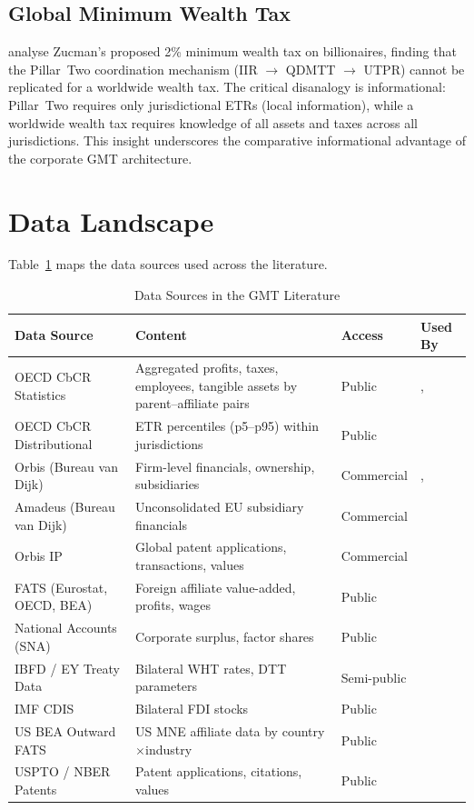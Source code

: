 \documentclass[11pt,a4paper]{article}
\begin{document}
\subsection{Global Minimum Wealth Tax}
\label{subsec:boadway}

\citet{boadway2026} analyse Zucman's proposed 2\% minimum wealth tax on billionaires, finding that the Pillar~Two coordination mechanism (IIR $\to$ QDMTT $\to$ UTPR) cannot be replicated for a worldwide wealth tax. The critical disanalogy is informational: Pillar~Two requires only jurisdictional ETRs (local information), while a worldwide wealth tax requires knowledge of all assets and taxes across all jurisdictions. This insight underscores the comparative informational advantage of the corporate GMT architecture.


\section{Data Landscape}
\label{sec:data}


Table~\ref{tab:data} maps the data sources used across the literature.

\begin{table}[htbp]
\centering
\small
\caption{Data Sources in the GMT Literature}
\label{tab:data}
\begin{tabular}{@{}p{3.5cm}p{4cm}p{2.5cm}p{3.5cm}@{}}
\toprule
\textbf{Data Source} & \textbf{Content} & \textbf{Access} & \textbf{Used By} \\
\midrule
OECD CbCR Statistics & Aggregated profits, taxes, employees, tangible assets by parent--affiliate pairs & Public & \citet{barake2022}, \citet{hugger2025} \\[4pt]
OECD CbCR Distributional & ETR percentiles (p5--p95) within jurisdictions & Public & \citet{hugger2025} \\[4pt]
Orbis (Bureau van Dijk) & Firm-level financials, ownership, subsidiaries & Commercial & \citet{devereux2023}, \citet{bilicka2023} \\[4pt]
Amadeus (Bureau van Dijk) & Unconsolidated EU subsidiary financials & Commercial & \citet{devereux2023} \\[4pt]
Orbis IP & Global patent applications, transactions, values & Commercial & \citet{bilicka2023} \\[4pt]
FATS (Eurostat, OECD, BEA) & Foreign affiliate value-added, profits, wages & Public & \citet{torslov2022} \\[4pt]
National Accounts (SNA) & Corporate surplus, factor shares & Public & \citet{torslov2022} \\[4pt]
IBFD / EY Treaty Data & Bilateral WHT rates, DTT parameters & Semi-public & \citet{vantriet2025} \\[4pt]
IMF CDIS & Bilateral FDI stocks & Public & \citet{vantriet2025} \\[4pt]
US BEA Outward FATS & US MNE affiliate data by country$\times$industry & Public & \citet{torslov2022} \\[4pt]
USPTO / NBER Patents & Patent applications, citations, values & Public & \citet{akcigit2022} \\[4pt]
\bottomrule
\end{tabular}
\end{table}
\end{document}
